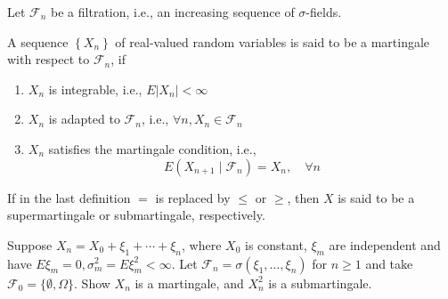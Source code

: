Let $\mathcal{F}_{n}$ be a filtration, i.e., an increasing sequence of $\sigma$-fields.
\begin{definition}[Martingale]
    A sequence $\left\{X_{n}\right\}$ of real-valued random variables  is said to be a martingale with respect to $\mathcal{F}_{n}$, if
    \begin{enumerate}
        \item $X_{n}$ is integrable, i.e., $E\left|X_{n}\right|<\infty$
        \item $X_{n}$ is adapted to $\mathcal{F}_{n}$, i.e., $\forall n,X_{n}\in \mathcal{F}_{n}$
        \item $X_{n}$ satisfies the martingale condition, i.e.,
              \begin{equation}
                  E\left(X_{n+1}\mid\mathcal{F}_{n}\right)=X_{n},\quad\forall n
              \end{equation}
    \end{enumerate}
\end{definition}

\begin{remark}
    If in the last definition $=$ is replaced by $\leq$ or $\geq$, then $X$ is said to be a supermartingale or submartingale, respectively.
\end{remark}

\begin{example}

\end{example}

\begin{example}

\end{example}

\begin{example}
    
\end{example}

\begin{example}
    Suppose $X_{n}=X_{0}+\xi_{1}+\cdots+\xi_{n}$, where $X_{0}$ is constant, $\xi_{m}$ are independent and have $E\xi_{m}=0,\sigma_{m}^{2}=E\xi_{m}^{2}<\infty$. Let $\mathcal{F}_{n}=\sigma\left(\xi_{1},\ldots,\xi_{n}\right)$ for $n\geq 1$ and take $\mathcal{F}_{0}=\{\emptyset, \Omega\}$. Show $X_{n}$ is a martingale, and $X_{n}^{2}$ is a submartingale.
\end{example}

